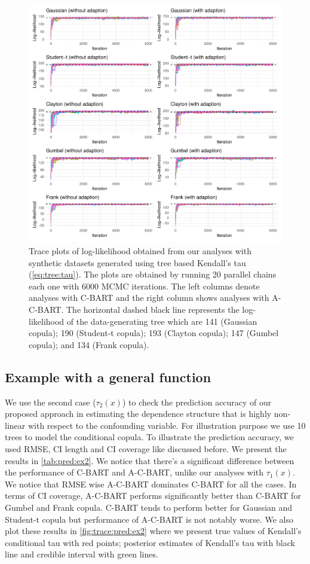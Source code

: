 \documentclass{amsart}
\begin{document}
\begin{figure}
	\centering
	\includegraphics[width = 0.95\linewidth]{"case_1_likelihood.pdf"}
	\caption{Trace plots of log-likelihood obtained from our analyses with synthetic datasets generated using tree based Kendall's tau (\cref{eq:tree:tau}). The plots are obtained by running 20 parallel chains each one with 6000 MCMC iterations. The left columns denote analyses with C-BART and the right column shows analyses with A-C-BART. The horizontal dashed black line represents the log-likelihood of the data-generating tree which are 141 (Gaussian copula); 190 (Student-t copula); 193 (Clayton copula); 147 (Gumbel copula); and 134 (Frank copula).}
	\label{fig:trace:like:ex1}
\end{figure}

\subsection{Example with a general function}
We use the second case ($\tau_2(x)$) to check the prediction accuracy of our proposed approach in estimating the dependence structure that is highly non-linear with respect to the confounding variable. For illustration purpose we use 10 trees to model the conditional copula. To illustrate the prediction accuracy, we used RMSE, CI length and CI coverage like discussed before. We present the results in \cref{tab:pred:ex2}. We notice that there's a significant difference between the performance of C-BART and A-C-BART, unlike our analyses with $\tau_1(x)$. We notice that RMSE wise A-C-BART dominates C-BART for all the cases. In terms of CI coverage, A-C-BART performs significantly better than C-BART for Gumbel and Frank copula. C-BART tends to perform better for Gaussian and Student-t copula but performance of A-C-BART is not notably worse. We also plot these results in \cref{fig:trace:pred:ex2} where we present true values of Kendall's conditional tau with red points; posterior estimates of Kendall's tau with black line and credible interval with green lines.
\end{document}
